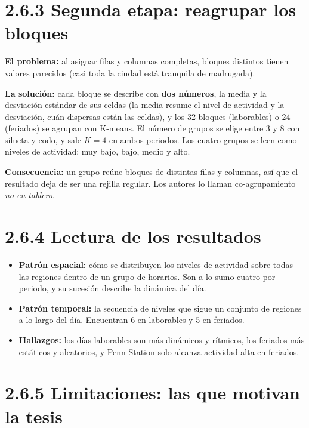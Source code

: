 \documentclass[11pt,a4paper]{article}
\begin{document}
\section{2.6.3 Segunda etapa: reagrupar los bloques}

\textbf{El problema:} al asignar filas y columnas completas, bloques distintos
tienen valores parecidos (casi toda la ciudad está tranquila de madrugada).

\textbf{La solución:} cada bloque se describe con \textbf{dos números}, la media y
la desviación estándar de sus celdas (la media resume el nivel de actividad y la
desviación, cuán dispersas están las celdas), y los 32 bloques (laborables) o 24
(feriados) se agrupan con K-means. El número de grupos se elige entre 3 y 8 con
silueta y codo, y sale $K=4$ en ambos periodos. Los cuatro grupos se leen como
niveles de actividad: muy bajo, bajo, medio y alto.

\textbf{Consecuencia:} un grupo reúne bloques de distintas filas y columnas, así
que el resultado deja de ser una rejilla regular. Los autores lo llaman
co-agrupamiento \emph{no en tablero}.

\section{2.6.4 Lectura de los resultados}

\begin{itemize}
  \item \textbf{Patrón espacial:} cómo se distribuyen los niveles de actividad
  sobre todas las regiones dentro de un grupo de horarios. Son a lo sumo cuatro por
  periodo, y su sucesión describe la dinámica del día.
  \item \textbf{Patrón temporal:} la secuencia de niveles que sigue un conjunto de
  regiones a lo largo del día. Encuentran 6 en laborables y 5 en feriados.
  \item \textbf{Hallazgos:} los días laborables son más dinámicos y rítmicos, los
  feriados más estáticos y aleatorios, y Penn Station solo alcanza actividad alta
  en feriados.
\end{itemize}

\section{2.6.5 Limitaciones: las que motivan la tesis}
\end{document}
